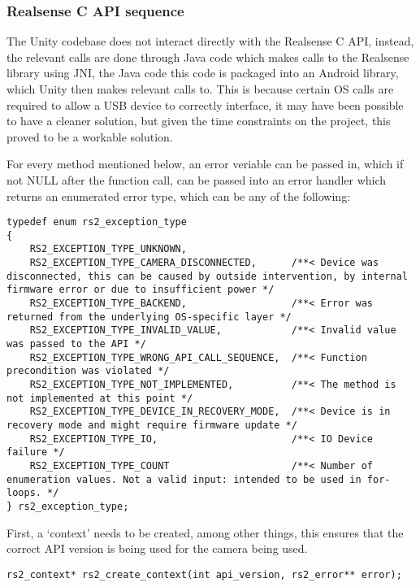     \subsubsection{Realsense C API sequence}
    The Unity codebase does not interact directly with the Realsense C API, instead, the relevant calls are done through Java code which makes calls to the Realsense library using JNI, the Java code  this code is packaged into an Android library, which Unity then makes relevant calls to. This is because certain OS calls are required to allow a USB device to correctly interface, it may have been possible to have a cleaner solution, but given the time constraints on the project, this proved to be a workable solution.

    For every method mentioned below, an error veriable can be passed in, which if not NULL after the function call, can be passed into an error handler which returns an enumerated error type, which can be any of the following:

    \begin{lstlisting}[style=CStyle]
typedef enum rs2_exception_type
{
    RS2_EXCEPTION_TYPE_UNKNOWN,
    RS2_EXCEPTION_TYPE_CAMERA_DISCONNECTED,      /**< Device was disconnected, this can be caused by outside intervention, by internal firmware error or due to insufficient power */
    RS2_EXCEPTION_TYPE_BACKEND,                  /**< Error was returned from the underlying OS-specific layer */
    RS2_EXCEPTION_TYPE_INVALID_VALUE,            /**< Invalid value was passed to the API */
    RS2_EXCEPTION_TYPE_WRONG_API_CALL_SEQUENCE,  /**< Function precondition was violated */
    RS2_EXCEPTION_TYPE_NOT_IMPLEMENTED,          /**< The method is not implemented at this point */
    RS2_EXCEPTION_TYPE_DEVICE_IN_RECOVERY_MODE,  /**< Device is in recovery mode and might require firmware update */
    RS2_EXCEPTION_TYPE_IO,                       /**< IO Device failure */
    RS2_EXCEPTION_TYPE_COUNT                     /**< Number of enumeration values. Not a valid input: intended to be used in for-loops. */
} rs2_exception_type;\end{lstlisting}

    First, a `context' needs to be created, among other things, this ensures that the correct API version is being used for the camera being used.
    \begin{lstlisting}[style=CStyle]
rs2_context* rs2_create_context(int api_version, rs2_error** error);\end{lstlisting}

